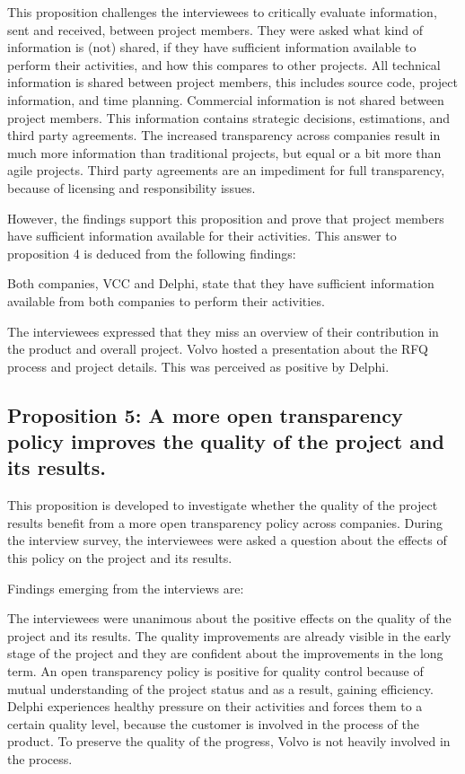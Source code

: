 This proposition challenges the interviewees to critically evaluate information, sent and received, between project members. They were asked what kind of information is (not) shared, if they have sufficient information available to perform their activities, and how this compares to other projects. All technical information is shared between project members, this includes source code, project information, and time planning. Commercial information is not shared between project members. This information contains strategic decisions, estimations, and third party agreements. The increased transparency across companies result in much more information than traditional projects, but equal or a bit more than agile projects. Third party agreements are an impediment for full transparency, because of licensing and responsibility issues.

However, the findings support this proposition and prove that project members have sufficient information available for their activities. This answer to proposition 4 is deduced from the following findings:

 Both companies, VCC and Delphi, state that they have sufficient information available from both companies to perform their activities. 

 The interviewees expressed that they miss an overview of their contribution in the product and overall project. Volvo hosted a presentation about the RFQ process and project details. This was perceived as positive by Delphi.


\subsection{Proposition 5: A more open transparency policy improves the quality of the project and its results.}

This proposition is developed to investigate whether the quality of the project results benefit from a more open transparency policy across companies. During the interview survey, the interviewees were asked a question about the effects of this policy on the project and its results. 

Findings emerging from the interviews are:

 The interviewees were unanimous about the positive effects on the quality of the project and its results. The quality improvements are already visible in the early stage of the project and they are confident about the improvements in the long term. An open transparency policy is positive for quality control because of mutual understanding of the project status and as a result, gaining efficiency. Delphi experiences healthy pressure on their activities and forces them to a certain quality level, because the customer is involved in the process of the product. To preserve the quality of the progress, Volvo is not heavily involved in the process.



